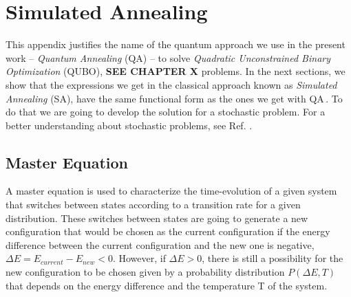 
\chapter{Simulated Annealing} %

This appendix justifies the name of the quantum approach we use in the present work -- \textit{Quantum Annealing} (QA) -- to solve \textit{Quadratic Unconstrained Binary Optimization} (QUBO), \textbf{SEE CHAPTER X} problems. In the next sections, we show that the expressions we get in the classical approach known as \textit{Simulated Annealing} (SA), have the same functional form as the ones we get with QA\,\cite{Kadowaki1998QuantumModel}. To do that we are going to develop the solution for a stochastic problem. For a better understanding about stochastic problems, see Ref. \cite{Schneider2006StochasticOptimization}. 
\label{AppendixB} %
\section{Master Equation}
A master equation is used to characterize the time-evolution of a given system that switches between states according to a transition rate for a given distribution. These switches between states are going to generate a new configuration that would be chosen as the current configuration if the energy difference between the current configuration and the new one is negative, $\Delta E = E_{current} - E_{new} < 0$. However, if $\Delta E > 0$, there is still a possibility for the new configuration to be chosen given by a probability distribution $P \left(\Delta E, T \right)$ that depends on the energy difference and the temperature T of the system.
